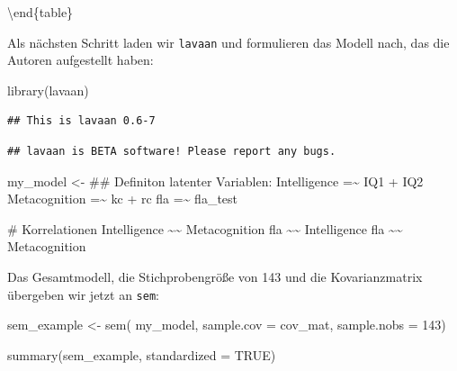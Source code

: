 \documentclass[
]{book}
\newenvironment{Shaded}{\begin{snugshade}}{\end{snugshade}}
\newcommand{\AttributeTok}[1]{\textcolor[rgb]{0.77,0.63,0.00}{#1}}
\newcommand{\ConstantTok}[1]{\textcolor[rgb]{0.00,0.00,0.00}{#1}}
\newcommand{\DecValTok}[1]{\textcolor[rgb]{0.00,0.00,0.81}{#1}}
\newcommand{\FunctionTok}[1]{\textcolor[rgb]{0.00,0.00,0.00}{#1}}
\newcommand{\NormalTok}[1]{#1}
\newcommand{\OtherTok}[1]{\textcolor[rgb]{0.56,0.35,0.01}{#1}}
\newcommand{\StringTok}[1]{\textcolor[rgb]{0.31,0.60,0.02}{#1}}
\begin{document}
\textbackslash end\{table\}

Als nächsten Schritt laden wir \texttt{lavaan} und formulieren das Modell nach, das die Autoren aufgestellt haben:

\begin{Shaded}
\begin{Highlighting}[]
\FunctionTok{library}\NormalTok{(lavaan)}
\end{Highlighting}
\end{Shaded}

\begin{verbatim}
## This is lavaan 0.6-7
\end{verbatim}

\begin{verbatim}
## lavaan is BETA software! Please report any bugs.
\end{verbatim}

\begin{Shaded}
\begin{Highlighting}[]
\NormalTok{my\_model }\OtherTok{\textless{}{-}} \StringTok{\textquotesingle{}}
\StringTok{\#\# Definiton latenter Variablen:}
\StringTok{Intelligence =\textasciitilde{} IQ1 + IQ2}
\StringTok{Metacognition =\textasciitilde{} kc + rc}
\StringTok{fla =\textasciitilde{} fla\_test}

\StringTok{\# Korrelationen}
\StringTok{Intelligence \textasciitilde{}\textasciitilde{} Metacognition}
\StringTok{fla \textasciitilde{}\textasciitilde{} Intelligence }
\StringTok{fla \textasciitilde{}\textasciitilde{} Metacognition}
\StringTok{\textquotesingle{}}
\end{Highlighting}
\end{Shaded}

Das Gesamtmodell, die Stichprobengröße von 143 und die Kovarianzmatrix übergeben wir jetzt an \texttt{sem}:

\begin{Shaded}
\begin{Highlighting}[]
\NormalTok{sem\_example }\OtherTok{\textless{}{-}} \FunctionTok{sem}\NormalTok{(}
\NormalTok{  my\_model,}
    \AttributeTok{sample.cov =}\NormalTok{ cov\_mat,}
    \AttributeTok{sample.nobs =} \DecValTok{143}\NormalTok{)}

\FunctionTok{summary}\NormalTok{(sem\_example, }\AttributeTok{standardized =} \ConstantTok{TRUE}\NormalTok{)}
\end{Highlighting}
\end{Shaded}
\end{document}
